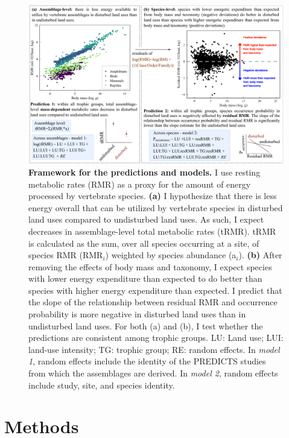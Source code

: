 \begin{landscape}
\begin{figure}
\centering
\includegraphics[scale=0.75]{figures/Chapter5/Figure2}
\caption[Framework for the predictions and models]{\textbf{Framework for the predictions and models.} I use resting metabolic rates (RMR) as a proxy for the amount of energy processed by vertebrate species. \textbf{(a)} I hypothesize that there is less energy overall that can be utilized by vertebrate species in disturbed land uses compared to undisturbed land uses. As such, I expect decreases in assemblage-level total metabolic rates (tRMR). tRMR is calculated as the sum, over all species occurring at a site, of species RMR (RMR$_i$) weighted by species abundance (a$_i$). \textbf{(b)} After removing the effects of body mass and taxonomy, I expect species with lower energy expenditure than expected to do better than species with higher energy expenditure than expected. I predict that the slope of the relationship between residual RMR and occurrence probability is more negative in disturbed land uses than in undisturbed land uses. For both (a) and (b), I test whether the predictions are consistent among trophic groups. LU: Land use; LUI: land-use intensity; TG: trophic group; RE: random effects. In \textit{model 1}, random effects include the identity of the PREDICTS studies from which the assemblages are derived. In \textit{model 2}, random effects include study, site, and species identity.}
\label{chap5_fig2}
\end{figure}
\end{landscape}


\clearpage

\section{Methods}

